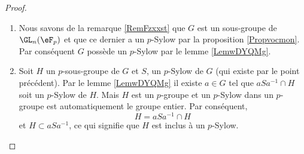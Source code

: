 \begin{proof}


%
%
%
%

    \begin{enumerate}
        \item
            
            Nous savons de la remarque \ref{RemFzxxst} que \( G\) est un sous-groupe de \( \GL_n(\eF_p)\) et que ce dernier a un $p$-Sylow par la proposition \ref{Propvocmon}. Par conséquent \( G\) possède un $p$-Sylow par le lemme \ref{LemwDYQMg}.

        \item

            Soit \( H\) un \( p\)-sous-groupe de \( G\) et \( S\), un $p$-Sylow de \( G\) (qui existe par le point précédent). Par le lemme \ref{LemwDYQMg} il existe \( a\in G\) tel que \( aSa^{-1}\cap H\) soit un $p$-Sylow de \( H\). Mais \( H\) est un \(p\)-groupe et un $p$-Sylow dans un \( p\)-groupe est automatiquement le groupe entier. Par conséquent,
            \begin{equation}
                H=aSa^{-1}\cap H
            \end{equation}
            et \( H\subset aSa^{-1}\), ce qui signifie que \( H\) est inclus à un $p$-Sylow.


\end{enumerate}
\end{proof}
